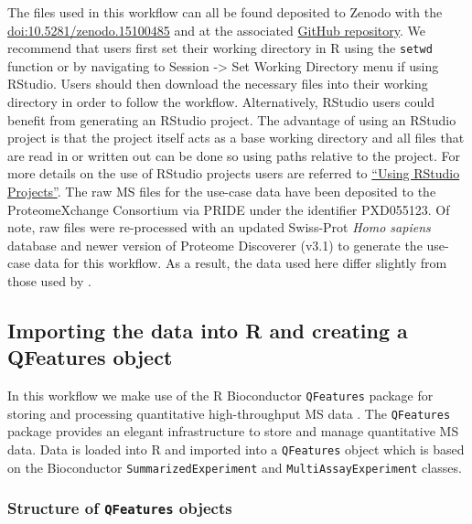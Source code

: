 \documentclass[9pt,a4paper,]{extarticle}
\begin{document}
The files used in this workflow can all be found deposited to Zenodo with the
\href{http://doi.org/10.5281/zenodo.15100485}{doi:10.5281/zenodo.15100485} and at the associated \href{https://github.com/CambridgeCentreForProteomics/f1000_subcellular_proteomics}{GitHub repository}.
We recommend that users first set their working directory in R using the \texttt{setwd} function
or by navigating to Session -\textgreater{} Set Working Directory menu if using RStudio. Users
should then download the necessary files into their working directory in order to
follow the workflow. Alternatively, RStudio users could benefit from generating
an RStudio project. The advantage of using an RStudio project is that the project
itself acts as a base working directory and all files that are read in or written
out can be done so using paths relative to the project. For more details on the
use of RStudio projects users are referred to \href{https://support.posit.co/hc/en-us/articles/200526207-Using-RStudio-Projects}{``Using RStudio Projects''}.
The raw MS files for the use-case data have been deposited to the ProteomeXchange
Consortium via PRIDE \citep{PerezRiverol2021, Deutsch2022} under the identifier PXD055123.
Of note, raw files were re-processed with an updated Swiss-Prot \emph{Homo sapiens} database
and newer version of Proteome Discoverer (v3.1) to generate the use-case data for
this workflow. As a result, the data used here differ slightly from those
used by \citet{Christopher2025}.

\subsection{Importing the data into R and creating a QFeatures object}\label{importing-the-data-into-r-and-creating-a-qfeatures-object}

In this workflow we make use of the R Bioconductor \texttt{QFeatures} package for
storing and processing quantitative high-throughput MS data \citep{qfeat}. The
\texttt{QFeatures} package provides an elegant infrastructure to store and manage
quantitative MS data. Data is loaded into R and imported into a \texttt{QFeatures} object which is
based on the Bioconductor \texttt{SummarizedExperiment} and \texttt{MultiAssayExperiment} classes.

\subsubsection{\texorpdfstring{Structure of \texttt{QFeatures} objects}{Structure of QFeatures objects}}\label{structure-of-qfeatures-objects}
\end{document}
